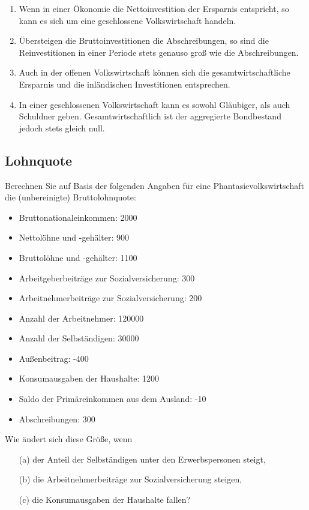 \documentclass{scrartcl}
\begin{document}
\begin{enumerate}
  \item Wenn in einer \"{O}konomie die Nettoinvestition der Ersparnis entspricht, so kann es sich
um eine geschlossene Volkswirtschaft handeln. %
\item \"{U}bersteigen die Bruttoinvestitionen die Abschreibungen, so sind die Reinvestitionen in einer Periode stets genauso gro{\ss} wie die Abschreibungen. %
\item Auch in der offenen Volkswirtschaft k\"{o}nnen sich die gesamtwirtschaftliche Ersparnis
und die inl\"{a}ndischen Investitionen entsprechen. %
\item In einer geschlossenen Volkswirtschaft kann es sowohl Gl\"{a}ubiger, als auch Schuldner
geben. Gesamtwirtschaftlich ist der aggregierte Bondbestand jedoch stets gleich null. %

\end{enumerate}

\subsection{Lohnquote}
Berechnen Sie auf Basis der folgenden Angaben f\"{u}r eine Phantasievolkswirtschaft die (unbereinigte) Bruttolohnquote:
\begin{itemize}
  \item Bruttonationaleinkommen: 2000
  \item Nettol\"{o}hne und -geh\"{a}lter: 900
  \item Bruttol\"{o}hne und -geh\"{a}lter: 1100
  \item Arbeitgeberbeitr\"{a}ge zur Sozialversicherung: 300
  \item Arbeitnehmerbeitr\"{a}ge zur Sozialversicherung: 200
  \item Anzahl der Arbeitnehmer: 120000
  \item Anzahl der Selbst\"{a}ndigen: 30000
  \item Au{\ss}enbeitrag: -400
  \item Konsumausgaben der Haushalte: 1200
  \item Saldo der Prim\"{a}reinkommen aus dem Ausland: -10
  \item Abschreibungen: 300
\end{itemize}
Wie \"{a}ndert sich diese Gr\"{o}{\ss}e, wenn
\begin{itemize}
\item[(a)] der Anteil der Selbst\"{a}ndigen unter den Erwerbspersonen steigt,
\item[(b)] die Arbeitnehmerbeitr\"{a}ge zur Sozialversicherung steigen,
\item[(c)] die Konsumausgaben der Haushalte fallen?
\end{itemize}
\end{document}
